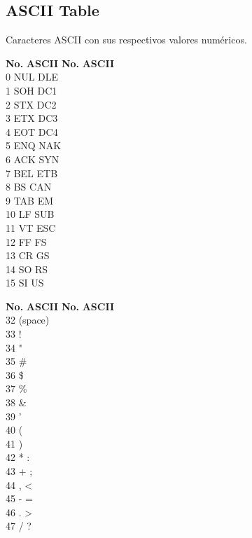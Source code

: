 \documentclass[11pt,letterpaper,twocolumn,twosided]{article}
\begin{document}
\subsection{ASCII Table}
Caracteres ASCII con sus respectivos valores num\'ericos.


\begin{tabbing}
\textbf{No.}\hspace{1cm} \=  \textbf{ASCII}\hspace{2cm} \= \textbf{No.}\hspace{1cm} \= \textbf{ASCII}\hspace{2cm}  \\ 
0 \> NUL  \> DLE \\
1 \> SOH  \> DC1 \\
2 \> STX  \> DC2 \\
3 \> ETX  \> DC3 \\
4 \> EOT  \> DC4 \\
5 \> ENQ  \> NAK \\
6 \> ACK  \> SYN \\
7 \> BEL  \> ETB \\
8 \> BS  \> CAN \\
9 \> TAB  \> EM \\
10 \> LF  \> SUB \\
11 \> VT  \> ESC \\
12 \> FF  \> FS \\
13 \> CR  \> GS \\
14 \> SO  \> RS \\
15 \> SI  \> US \\ 
\end{tabbing}


\begin{tabbing}
\textbf{No.}\hspace{1cm} \=  \textbf{ASCII}\hspace{2cm} \= \textbf{No.}\hspace{1cm} \= \textbf{ASCII}\hspace{2cm}  \\ 
32 \> (space)   \\
33 \> !   \\
34 \> "   \\
35 \> \#   \\
36 \> \$   \\
37 \> \%   \\
38 \> \&   \\
39 \> '   \\
40 \> (   \\
41 \> )   \\
42 \> *  \> : \\
43 \> +  \> ; \\
44 \> ,  \> < \\
45 \> -  \> = \\
46 \> .  \> > \\
47 \> /  \> ? \\ 
\end{tabbing}
\end{document}
